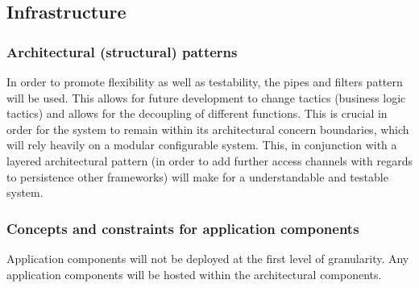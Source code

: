 \documentclass{article}
\begin{document}
	\subsection{Infrastructure}

	\subsubsection{Architectural (structural) patterns}

	In order to promote flexibility as well as testability, the pipes and filters pattern will be used. This allows for future development to change tactics (business logic tactics) and allows for the decoupling of different functions. This is crucial in order for the system to remain within its architectural concern boundaries, which will rely heavily on a modular configurable system. This, in conjunction with a layered architectural pattern (in order to add further access channels with regards to persistence other frameworks) will make for a understandable and testable system.

	\subsubsection{Concepts and constraints for application components}

	Application components will not be deployed at the first level of granularity. Any application components will be hosted within the architectural components.


	
\end{document}
